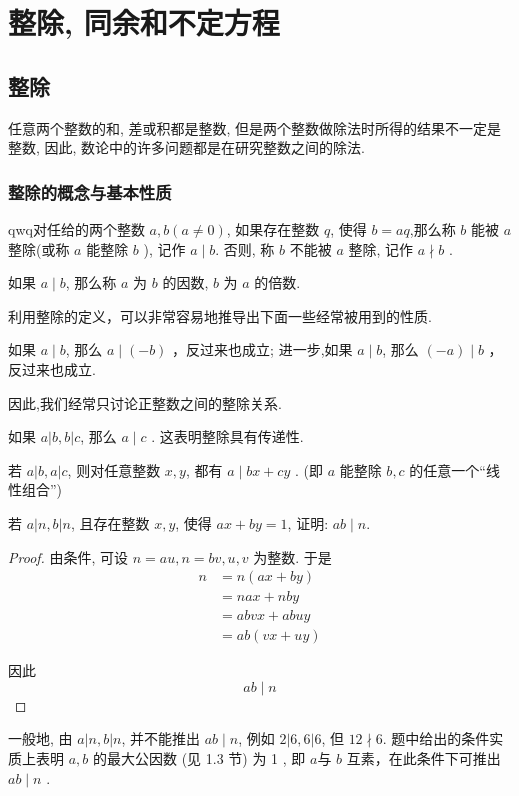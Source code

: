 \chapter{整除, 同余和不定方程}
\section{整除}
任意两个整数的和, 差或积都是整数, 但是两个整数做除法时所得的结果不一定是整数, 因此, 数论中的许多问题都是在研究整数之间的除法.

\subsection{整除的概念与基本性质}
\begin{definition}
qwq对任给的两个整数 $a ,  b(a \neq 0)$, 如果存在整数 $q$, 使得 $b=a q$,那么称 $b$ 能被 $a$ 整除(或称 $a$ 能整除 $b$ ), 记作 $a \mid b$. 否则, 称 $b$ 不能被 $a$ 整除, 记作 $a \nmid b$ . 

如果 $a \mid b$, 那么称 $a$ 为 $b$ 的因数, $b$ 为 $a$ 的倍数.
\end{definition}

利用整除的定义，可以非常容易地推导出下面一些经常被用到的性质. 

\begin{property}
如果 $a \mid b$, 那么 $a \mid(-b)$ ，反过来也成立; 进一步,如果 $a \mid b$, 那么 $(-a) \mid b$ ，反过来也成立.
\end{property}

因此,我们经常只讨论正整数之间的整除关系.

\begin{property}
如果 $a|b, b| c$, 那么 $a \mid c$ . 这表明整除具有传递性.
\end{property}

\begin{property}
若 $a|b, a| c$, 则对任意整数 $x ,  y$, 都有 $a \mid b x+c y$ . (即 $a$ 能整除 $b ,  c$ 的任意一个“线性组合”)
\end{property}

\begin{example}
若 $a|n, b| n$, 且存在整数 $x ,  y$, 使得 $a x+b y=1$, 证明: $a b \mid n$.
\end{example}
\begin{proof}
由条件, 可设 $n=a u, n=b v, u ,  v$ 为整数. 于是\\
\begin{align}
n & =n(a x+b y) \\
& =n a x+n b y \\
& =a b v x+a b u y \\
& =a b(v x+u y)
\end{align}

因此
\begin{equation*}
a b \mid n
\end{equation*}
\end{proof}
\begin{note}
一般地, 由 $a|n, b| n$, 并不能推出 $a b \mid n$, 例如 $2|6,6| 6$, 但 $12 \nmid 6$. 题中给出的条件实质上表明 $a ,  b$ 的最大公因数 (见 1.3 节) 为 1 , 即 $a$与 $b$ 互素，在此条件下可推出 $a b \mid n$ . 
\end{note}

